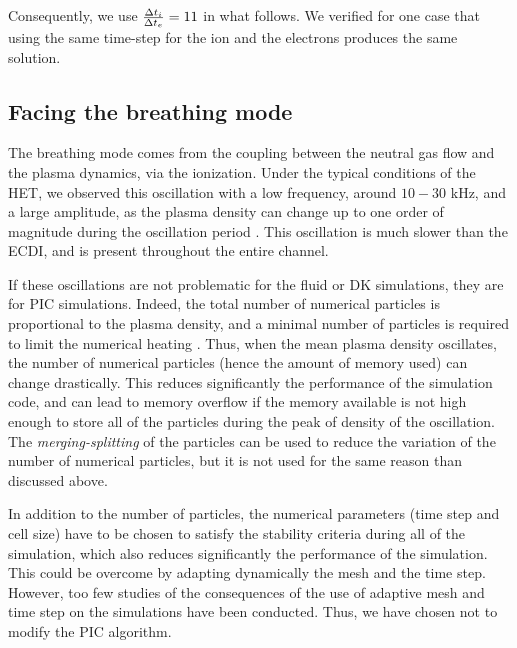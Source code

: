Consequently, we use $\frac{\Delta t_i}{\Delta t_e} = 11$ in what follows.
We verified for one case that using the same time-step for the ion and the electrons produces the same solution.


\subsection{Facing the breathing mode} \label{subsec-breathmod}
The breathing mode comes from the coupling between the neutral gas flow and the plasma dynamics, via the ionization.
Under the typical conditions of the \ac{HET}, we observed this oscillation with a low frequency, around  $10-30$ kHz, and a large amplitude, as the plasma density can change up to one order of magnitude during the oscillation period \citep{barral2003a,barral2009}.
This oscillation is much slower than the \ac{ECDI}, and is present throughout the entire channel.

If these oscillations are not problematic for the fluid or \ac{DK} simulations, they are for \ac{PIC} simulations.
Indeed, the total number of numerical particles is proportional to the plasma density, and a minimal number of particles is required to limit the numerical heating \citep{turner2006}.
Thus, when the mean plasma density oscillates, the number of numerical particles (hence the amount of memory used) can change drastically.
This reduces significantly the performance of the simulation code, and can lead to memory overflow if the memory available is not high enough to store all of the particles during the peak of density  of the oscillation.
The \emph{merging-splitting} of the particles  can be used to reduce the variation of the number of numerical particles, but it is not used for the same reason than discussed above.

In addition to the number of particles, the numerical parameters (time step and cell size) have to be chosen to satisfy the stability criteria during all of the simulation, which also reduces significantly the performance of the simulation. 
This could be overcome by adapting dynamically the mesh and the time step.
However, too few studies of the consequences of the use of adaptive mesh and time step on the simulations have been conducted.
Thus, we have chosen not to modify the \ac{PIC} algorithm.

